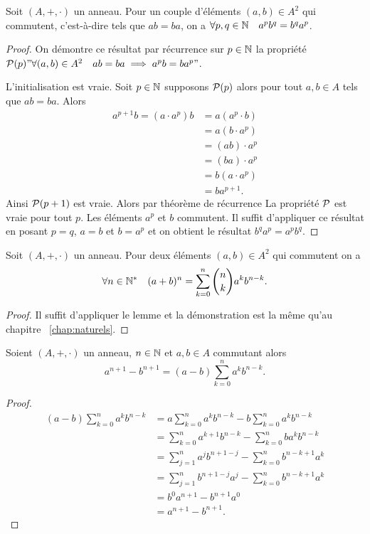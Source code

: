 \begin{lemme}
  Soit \((A,+,\cdot)\) un anneau. Pour un couple d'éléments \((a,b) \in A^2\) qui commutent, c'est-à-dire tels que \(ab=ba\), on a \(\forall p,q \in \N \quad a^pb^q=b^qa^p\).
\end{lemme}
\begin{proof}
  On démontre ce résultat par récurrence sur \(p \in \N\) la propriété \(\P(p) "\forall (a,b) \in A^2 \quad ab=ba \implies a^pb=ba^p"\).

L'initialisation est vraie. Soit \(p \in \N\) supposons \(\P(p)\) alors pour tout \(a,b \in A\) tels que \(ab=ba\). Alors
\begin{align}
  a^{p+1}b=(a \cdot a^p)b&=a(a^p \cdot b) \\
  &=a(b\cdot a^p)\\
  &=(ab) \cdot a^p\\
  &=(ba) \cdot a^p\\
  &=b(a \cdot a^p)\\
  &=b a^{p+1}.
\end{align}
Ainsi \(\P(p+1)\) est vraie. Alors par théorème de récurrence La propriété \(\P\) est vraie pour tout \(p\). Les éléments \(a^p\) et \(b\) commutent. Il suffit d'appliquer ce résultat en posant \(p=q\), \(a=b\) et \(b=a^p\) et on obtient le résultat \(b^qa^p=a^pb^q\).
\end{proof}
\begin{theo}
  Soit \((A,+,\cdot)\) un anneau. Pour deux éléments \((a,b) \in A^2\) qui commutent on a
  \begin{equation}
    \forall n \in \N^* \quad (a+b)^n=\sum_{k=0}^n \binom{n}{k} a^k b^{n-k}.
  \end{equation}
\end{theo}
\begin{proof}
  Il suffit d'appliquer le lemme et la démonstration est la même qu'au chapitre~
\ref{chap:naturels}.
\end{proof}
\begin{theo}
  Soient \((A,+,\cdot)\) un anneau, \(n \in \N\) et \(a,b \in A\) commutant alors
  \begin{equation}
    a^{n+1}-b^{n+1}=(a-b)\sum_{k=0}^n a^kb^{n-k}.
  \end{equation}
\end{theo}
\begin{proof}
  \begin{align}
    (a-b)\sum_{k=0}^n a^kb^{n-k} &= a \sum_{k=0}^n a^kb^{n-k} - b \sum_{k=0}^n a^kb^{n-k}\\
&=\sum_{k=0}^n a^{k+1}b^{n-k} - \sum_{k=0}^n ba^kb^{n-k}\\
&=\sum_{j=1}^n a^jb^{n+1-j} - \sum_{k=0}^n b^{n-k+1}a^k \\
&=\sum_{j=1}^n b^{n+1-j}a^j - \sum_{k=0}^n b^{n-k+1}a^k \\
&=b^0a^{n+1}-b^{n+1}a^0\\
&=a^{n+1}-b^{n+1}.
  \end{align}
\end{proof}
